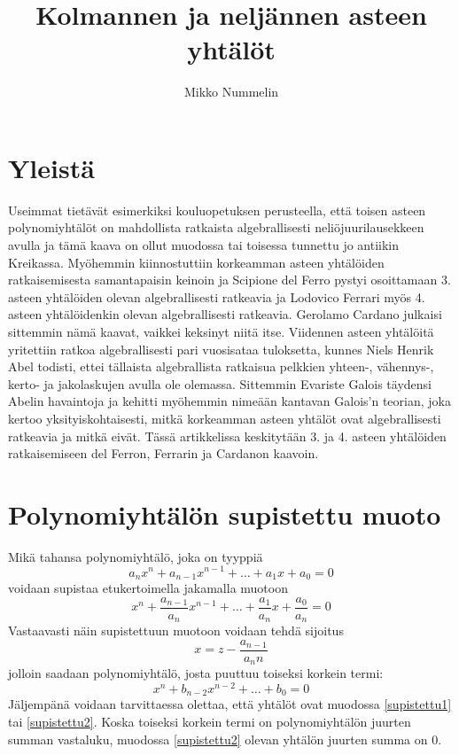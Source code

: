 \documentclass[a4paper]{article}
\begin{document}
\title{Kolmannen ja neljännen asteen yhtälöt}
\author{Mikko Nummelin}
\maketitle
\tableofcontents
\section{Yleistä}
Useimmat tietävät esimerkiksi kouluopetuksen perusteella, että toisen asteen polynomiyhtälöt on mahdollista ratkaista algebrallisesti neliöjuurilausekkeen avulla ja tämä kaava on ollut muodossa tai toisessa tunnettu jo antiikin Kreikassa. Myöhemmin kiinnostuttiin korkeamman asteen yhtälöiden ratkaisemisesta samantapaisin keinoin ja Scipione del Ferro pystyi osoittamaan 3. asteen yhtälöiden olevan algebrallisesti ratkeavia ja Lodovico Ferrari myös 4. asteen yhtälöidenkin olevan algebrallisesti ratkeavia. Gerolamo Cardano julkaisi sittemmin nämä kaavat, vaikkei keksinyt niitä itse. Viidennen asteen yhtälöitä yritettiin ratkoa algebrallisesti pari vuosisataa tuloksetta, kunnes Niels Henrik Abel todisti, ettei tällaista algebrallista ratkaisua pelkkien yhteen-, vähennys-, kerto- ja jakolaskujen avulla ole olemassa. Sittemmin Evariste Galois täydensi Abelin havaintoja ja kehitti myöhemmin nimeään kantavan Galois'n teorian, joka kertoo yksityiskohtaisesti, mitkä korkeamman asteen yhtälöt ovat algebrallisesti ratkeavia ja mitkä eivät. Tässä artikkelissa keskitytään 3. ja 4. asteen yhtälöiden ratkaisemiseen del Ferron, Ferrarin ja Cardanon kaavoin.
\section{Polynomiyhtälön supistettu muoto}
Mikä tahansa polynomiyhtälö, joka on tyyppiä
$$
a_n x^n+a_{n-1} x^{n-1}+\ldots+a_1 x+a_0 = 0
$$
voidaan supistaa etukertoimella jakamalla muotoon
\begin{equation}
  \label{supistettu1}
x^n+\frac{a_{n-1}}{a_n} x^{n-1}+\ldots+\frac{a_1}{a_n} x+\frac{a_0}{a_n} = 0
\end{equation}
Vastaavasti näin supistettuun muotoon voidaan tehdä sijoitus
$$
x=z-\frac{a_{n-1}}{a_n n}
$$
jolloin saadaan polynomiyhtälö, josta puuttuu toiseksi korkein termi:
\begin{equation}
  \label{supistettu2}
x^n+b_{n-2} x^{n-2}+\ldots+b_0 = 0
\end{equation}
Jäljempänä voidaan tarvittaessa olettaa, että yhtälöt ovat muodossa \ref{supistettu1} tai \ref{supistettu2}. Koska toiseksi korkein termi on polynomiyhtälön juurten summan vastaluku, muodossa \ref{supistettu2} olevan yhtälön juurten summa on 0.
\end{document}
